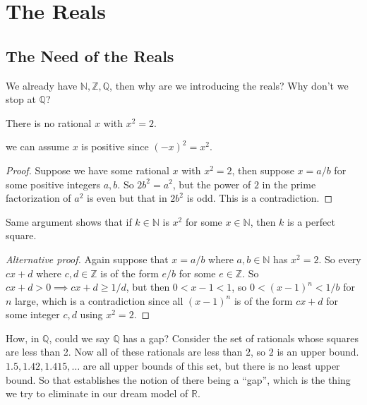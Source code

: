 \section{The Reals}
\subsection{The Need of the Reals}
We already have $\mathbb N, \mathbb Z, \mathbb Q$, then why are we introducing the reals?
Why don't we stop at $\mathbb Q$?
\begin{proposition}
    There is no rational $x$ with $x^2=2$.
\end{proposition}
we can assume $x$ is positive since $(-x)^2=x^2$.
\begin{proof}
    Suppose we have some rational $x$ with $x^2=2$, then suppose $x=a/b$ for some positive integers $a,b$.
    So $2b^2=a^2$, but the power of $2$ in the prime factorization of $a^2$ is even but that in $2b^2$ is odd.
    This is a contradiction.
\end{proof}
\begin{remark}
    Same argument shows that if $k\in\mathbb N$ is $x^2$ for some $x\in\mathbb N$, then $k$ is a perfect square.
\end{remark}
\begin{proof}[Alternative proof]
    Again suppose that $x=a/b$ where $a,b\in\mathbb N$ has $x^2=2$.
    So every $cx+d$ where $c,d\in\mathbb Z$ is of the form $e/b$ for some $e\in\mathbb Z$.
    So $cx+d>0\implies cx+d\ge 1/d$, but then $0<x-1<1$, so $0<(x-1)^n<1/b$ for $n$ large, which is a contradiction since all $(x-1)^n$ is of the form $cx+d$ for some integer $c,d$ using $x^2=2$.
\end{proof}
How, in $\mathbb Q$, could we say $\mathbb Q$ has a gap?
Consider the set of rationals whose squares are less than 2.
Now all of these rationals are less than $2$, so $2$ is an upper bound.
$1.5,1.42,1.415,\ldots$ are all upper bounds of this set, but there is no least upper bound.
So that establishes the notion of there being a ``gap'', which is the thing we try to eliminate in our dream model of $\mathbb R$.
